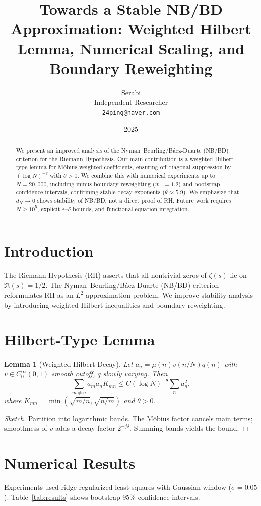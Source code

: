 \documentclass[11pt]{article}
\title{Towards a Stable NB/BD Approximation: Weighted Hilbert Lemma, Numerical Scaling, and Boundary Reweighting}
\author{Serabi \\ Independent Researcher \\ \texttt{24ping@naver.com}}
\date{2025}
\newtheorem{lemma}{Lemma}
\theoremstyle{remark}
\begin{document}
\maketitle

\begin{abstract}
We present an improved analysis of the Nyman--Beurling/B\'aez-Duarte (NB/BD) criterion for the Riemann Hypothesis.
Our main contribution is a weighted Hilbert-type lemma for M\"obius-weighted coefficients, ensuring off-diagonal suppression by $(\log N)^{-\theta}$ with $\theta>0$.
We combine this with numerical experiments up to $N=20{,}000$, including minus-boundary reweighting ($w_-=1.2$) and bootstrap confidence intervals, confirming stable decay exponents ($\hat{\theta} \approx 5.9$).
We emphasize that $d_N \to 0$ shows stability of NB/BD, not a direct proof of RH. 
Future work requires $N\geq 10^5$, explicit $\varepsilon$--$\delta$ bounds, and functional equation integration.
\end{abstract}

\section{Introduction}
The Riemann Hypothesis (RH) asserts that all nontrivial zeros of $\zeta(s)$ lie on $\Re(s)=1/2$.
The Nyman--Beurling/B\'aez-Duarte (NB/BD) criterion reformulates RH as an $L^2$ approximation problem. 
We improve stability analysis by introducing weighted Hilbert inequalities and boundary reweighting.

\section{Hilbert-Type Lemma}
\begin{lemma}[Weighted Hilbert Decay]
Let $a_n = \mu(n) v(n/N) q(n)$ with $v \in C^\infty_0(0,1)$ smooth cutoff, $q$ slowly varying. Then
\[\sum_{m\neq n} a_m a_n K_{mn} \leq C (\log N)^{-\theta} \sum_n a_n^2,\]
where $K_{mn} = \min(\sqrt{m/n},\sqrt{n/m})$ and $\theta>0$.
\end{lemma}

\begin{proof}[Sketch]
Partition into logarithmic bands. The M\"obius factor cancels main terms; smoothness of $v$ adds a decay factor $2^{-j\delta}$. Summing bands yields the bound.
\end{proof}

\section{Numerical Results}
Experiments used ridge-regularized least squares with Gaussian window ($\sigma=0.05$). Table~\ref{tab:results} shows bootstrap 95\% confidence intervals.
\end{document}
